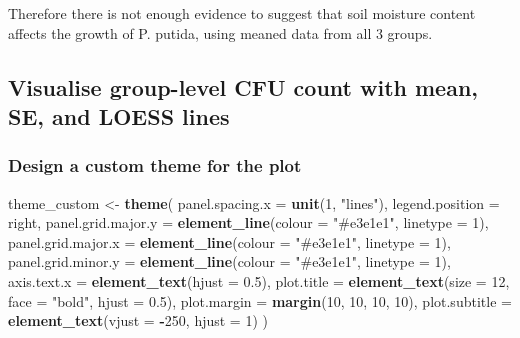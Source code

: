 \documentclass[
]{article}
\newenvironment{Shaded}{\begin{snugshade}}{\end{snugshade}}
\newcommand{\AttributeTok}[1]{\textcolor[rgb]{0.13,0.29,0.53}{#1}}
\newcommand{\DecValTok}[1]{\textcolor[rgb]{0.00,0.00,0.81}{#1}}
\newcommand{\FloatTok}[1]{\textcolor[rgb]{0.00,0.00,0.81}{#1}}
\newcommand{\FunctionTok}[1]{\textcolor[rgb]{0.13,0.29,0.53}{\textbf{#1}}}
\newcommand{\NormalTok}[1]{#1}
\newcommand{\OtherTok}[1]{\textcolor[rgb]{0.56,0.35,0.01}{#1}}
\newcommand{\SpecialCharTok}[1]{\textcolor[rgb]{0.81,0.36,0.00}{\textbf{#1}}}
\newcommand{\StringTok}[1]{\textcolor[rgb]{0.31,0.60,0.02}{#1}}
\begin{document}
Therefore there is not enough evidence to suggest that soil moisture
content affects the growth of P. putida, using meaned data from all 3
groups.

\subsection{Visualise group-level CFU count with mean, SE, and LOESS
lines}\label{visualise-group-level-cfu-count-with-mean-se-and-loess-lines}

\subsubsection{Design a custom theme for the
plot}\label{design-a-custom-theme-for-the-plot}

\begin{Shaded}
\begin{Highlighting}[]
\NormalTok{theme\_custom }\OtherTok{\textless{}{-}} \FunctionTok{theme}\NormalTok{(}
  \AttributeTok{panel.spacing.x =} \FunctionTok{unit}\NormalTok{(}\DecValTok{1}\NormalTok{, }\StringTok{"lines"}\NormalTok{),}
  \AttributeTok{legend.position =} \StringTok{\textquotesingle{}right\textquotesingle{}}\NormalTok{,}
  \AttributeTok{panel.grid.major.y =} \FunctionTok{element\_line}\NormalTok{(}\AttributeTok{colour =} \StringTok{"\#e3e1e1"}\NormalTok{, }\AttributeTok{linetype =} \DecValTok{1}\NormalTok{),}
  \AttributeTok{panel.grid.major.x =} \FunctionTok{element\_line}\NormalTok{(}\AttributeTok{colour =} \StringTok{"\#e3e1e1"}\NormalTok{, }\AttributeTok{linetype =} \DecValTok{1}\NormalTok{),}
  \AttributeTok{panel.grid.minor.y =} \FunctionTok{element\_line}\NormalTok{(}\AttributeTok{colour =} \StringTok{"\#e3e1e1"}\NormalTok{, }\AttributeTok{linetype =} \DecValTok{1}\NormalTok{),}
  \AttributeTok{axis.text.x =} \FunctionTok{element\_text}\NormalTok{(}\AttributeTok{hjust =} \FloatTok{0.5}\NormalTok{),}
  \AttributeTok{plot.title =} \FunctionTok{element\_text}\NormalTok{(}\AttributeTok{size =} \DecValTok{12}\NormalTok{, }\AttributeTok{face =} \StringTok{"bold"}\NormalTok{, }\AttributeTok{hjust =} \FloatTok{0.5}\NormalTok{),}
  \AttributeTok{plot.margin =} \FunctionTok{margin}\NormalTok{(}\DecValTok{10}\NormalTok{, }\DecValTok{10}\NormalTok{, }\DecValTok{10}\NormalTok{, }\DecValTok{10}\NormalTok{),}
  \AttributeTok{plot.subtitle =} \FunctionTok{element\_text}\NormalTok{(}\AttributeTok{vjust =} \SpecialCharTok{{-}}\DecValTok{250}\NormalTok{, }\AttributeTok{hjust =} \DecValTok{1}\NormalTok{)}
\NormalTok{)}
\end{Highlighting}
\end{Shaded}
\end{document}

